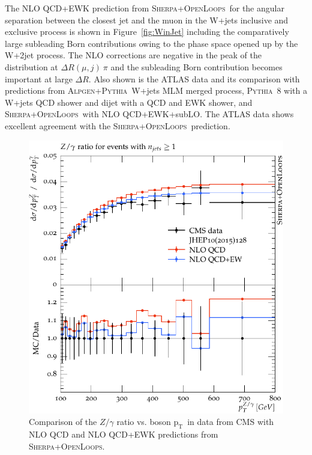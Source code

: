 \documentclass[a4paper,11pt,notoc]{article}
\newcommand{\pt}{\ensuremath{\mathrm{p_T}}}
\newcommand{\PYTHIA}{\textsc{Pythia}}
\newcommand{\SHERPA}{\textsc{Sherpa}}
\newcommand{\OPENLOOPS}{\textsc{OpenLoops}}
\newcommand{\ALPGEN}{\textsc{Alpgen}}
\begin{document}
The NLO QCD+EWK prediction from \SHERPA+\OPENLOOPS\ for the angular separation between the closest jet and the muon in the W+jets inclusive and exclusive process is shown in Figure~\ref{fig:WinJet} including the comparatively large subleading Born contributions owing to the phase space opened up by the W+2jet process. The NLO corrections are negative in the peak of the distribution at $\Delta R(\mu,j) ~ \pi$ and the subleading Born contribution becomes important at large $\Delta R$.
Also shown is the ATLAS data and its comparison with predictions from \ALPGEN+\PYTHIA\ W+jets MLM merged process, \PYTHIA\ 8 with a W+jets QCD shower and dijet with a QCD and EWK shower, and \SHERPA+\OPENLOOPS\ with NLO QCD+EWK+subLO. The ATLAS data shows excellent agreement with the \SHERPA+\OPENLOOPS\ prediction. 
\begin{figure}[t!]
\centering
\includegraphics[width=0.495\columnwidth]{Zgammaratio.pdf} 
\caption{Comparison of the $Z/\gamma$ ratio vs. boson \pt\ in data from CMS with NLO QCD and NLO QCD+EWK predictions from \SHERPA+\OPENLOOPS.}
\label{fig:ZGratio-sherpa}
\end{figure}   
\end{document}
